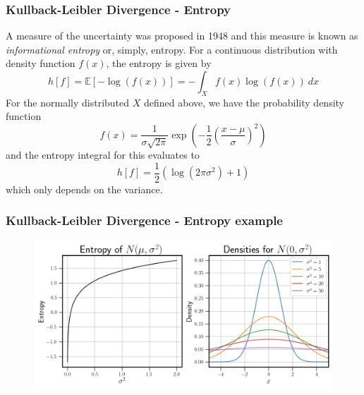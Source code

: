 \documentclass[11pt,aspectratio=169]{beamer}
\newcommand{\parens}[1]{\left(#1\right)}
\newcommand{\sqbracks}[1]{\left[#1\right]}
\begin{document}
    \begin{frame}
        \frametitle{Kullback-Leibler Divergence - Entropy}
        A measure of the uncertainty was 
        proposed in 1948 and this measure is known as \emph{informational entropy} \cite{shannon}
        or, simply, entropy. For a
        continuous distribution with density function $f(x)$, the entropy is given by 
        \begin{equation}
            h[f] = \mathbb{E}\sqbracks{-\log(f(x))} = -\int_X f(x)\log(f(x))\ dx    
        \end{equation}
        For the normally distributed $X$ defined above, we have the probability density function
        \begin{equation}
        f(x) = \frac{1}{\sigma\sqrt{2\pi}}\exp\parens{-\frac{1}{2}\parens{\frac{x-\mu}{\sigma}}^2} 
        \label{eqn:normal} 
        \end{equation}
        and the entropy integral for this evaluates to
        \begin{equation}
            h[f] = \frac{1}{2}\parens{\log(2\pi\sigma^2) + 1}
        \end{equation}
        which only depends on the variance.
    \end{frame}

    \begin{frame}
        \frametitle{Kullback-Leibler Divergence - Entropy example}
        \begin{figure}
            \centering
            \includegraphics[width=\textwidth]{../Figures/entropy_densities_example.png}
        \end{figure}
    \end{frame}
\end{document}
